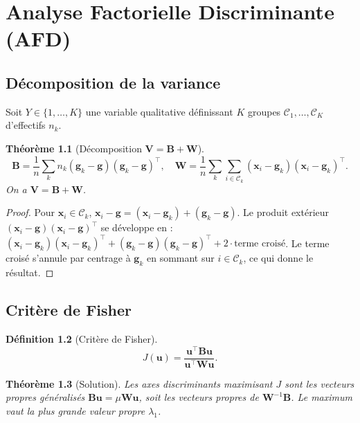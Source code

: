\documentclass[11pt, a4paper, openany]{book}
\theoremstyle{plain}
\newtheorem{theorem}{Théorème}[chapter]
\theoremstyle{definition}
\newtheorem{definition}[theorem]{Définition}
\theoremstyle{remark}
\newcommand{\1}{\mathds{1}}
\newcommand{\V}{\mathbf{V}}
\newcommand{\B}{\mathbf{B}}
\newcommand{\W}{\mathbf{W}}
\begin{document}
\chapter{Analyse Factorielle Discriminante (AFD)}

\section{Décomposition de la variance}

Soit $Y \in \{1, \ldots, K\}$ une variable qualitative définissant $K$ groupes
$\mathcal{C}_1, \ldots, \mathcal{C}_K$ d'effectifs $n_k$.

\begin{theorem}[Décomposition $\V = \B + \W$]
\[
\B = \frac{1}{n}\sum_k n_k (\mathbf{g}_k - \mathbf{g})(\mathbf{g}_k - \mathbf{g})^\top, \quad
\W = \frac{1}{n}\sum_k \sum_{i \in \mathcal{C}_k} (\mathbf{x}_i - \mathbf{g}_k)(\mathbf{x}_i - \mathbf{g}_k)^\top.
\]
On a $\V = \B + \W$.
\end{theorem}

\begin{proof}
Pour $\mathbf{x}_i \in \mathcal{C}_k$, $\mathbf{x}_i - \mathbf{g} = (\mathbf{x}_i - \mathbf{g}_k) + (\mathbf{g}_k - \mathbf{g})$.
Le produit extérieur $(\mathbf{x}_i - \mathbf{g})(\mathbf{x}_i - \mathbf{g})^\top$ se développe en :
$(\mathbf{x}_i - \mathbf{g}_k)(\mathbf{x}_i - \mathbf{g}_k)^\top + (\mathbf{g}_k - \mathbf{g})(\mathbf{g}_k - \mathbf{g})^\top + 2 \cdot \text{terme croisé}$.
Le terme croisé s'annule par centrage à $\mathbf{g}_k$ en sommant sur $i \in \mathcal{C}_k$,
ce qui donne le résultat.
\end{proof}

\section{Critère de Fisher}

\begin{definition}[Critère de Fisher]
\[
J(\mathbf{u}) = \frac{\mathbf{u}^\top \B \mathbf{u}}{\mathbf{u}^\top \W \mathbf{u}}.
\]
\end{definition}

\begin{theorem}[Solution]
Les axes discriminants maximisant $J$ sont les vecteurs propres généralisés
$\B \mathbf{u} = \mu \W \mathbf{u}$, soit les vecteurs propres de $\W^{-1} \B$. Le maximum
vaut la plus grande valeur propre $\lambda_1$.
\end{theorem}
\end{document}
